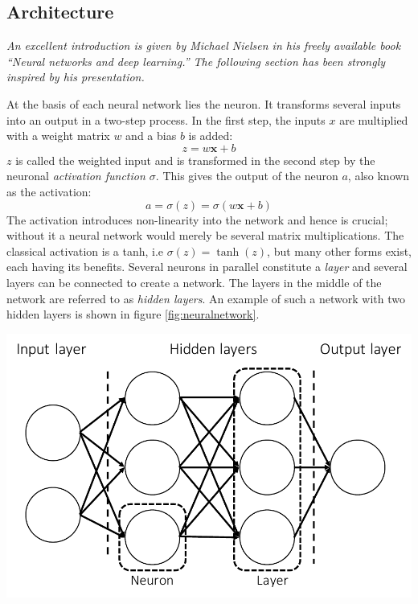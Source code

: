 \documentclass{Dissertate}
\let\origfigure\figure
\let\endorigfigure\endfigure
\renewenvironment{figure}[1][2] {
    \expandafter\origfigure\expandafter[H]
} {
    \endorigfigure
}
\begin{document}
\hypertarget{architecture}{%
\subsection{Architecture}\label{architecture}}

\emph{An excellent introduction is given by Michael Nielsen in his
freely available book ``Neural networks and deep learning.'' The
following section has been strongly inspired by his presentation.}

At the basis of each neural network lies the neuron. It transforms
several inputs into an output in a two-step process. In the first step,
the inputs \(x\) are multiplied with a weight matrix \(w\) and a bias
\(b\) is added: \[
z = w\mathbf{x}+b
\] \(z\) is called the weighted input and is transformed in the second
step by the neuronal \emph{activation function \(\sigma\)}. This gives
the output of the neuron \(a\), also known as the activation:
\begin{equation}
a = \sigma(z) = \sigma(w\mathbf{x}+b)
\label{eq:activation}\end{equation} The activation introduces
non-linearity into the network and hence is crucial; without it a neural
network would merely be several matrix multiplications. The classical
activation is a tanh, i.e \(\sigma(z)=\tanh(z)\), but many other forms
exist, each having its benefits. Several neurons in parallel constitute
a \emph{layer} and several layers can be connected to create a network.
The layers in the middle of the network are referred to as \emph{hidden
layers}. An example of such a network with two hidden layers is shown in
figure \ref{fig:neuralnetwork}.

\begin{figure}
\hypertarget{fig:neuralnetwork}{%
\centering
\includegraphics{source/figures/pdf/neuralnetwork.pdf}
\caption{Schematic overview of a neural network. The left layer is known
as the input layer, the right layer as the output layer and the layers
inbetween are referred to as hidden layers.}\label{fig:neuralnetwork}
}
\end{figure}
\end{document}
